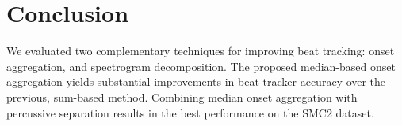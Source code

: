 \documentclass{article}
\begin{document}

\section{Conclusion}
\label{sec:conclusion}
We evaluated two complementary techniques for improving beat tracking: onset aggregation, and spectrogram decomposition.
The proposed median-based onset aggregation yields substantial improvements in beat
tracker accuracy over the previous, sum-based method. 
Combining median onset aggregation with percussive separation results in the best performance on the SMC2 dataset.




\end{document}
